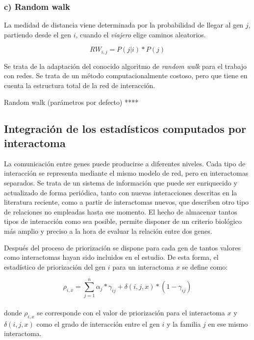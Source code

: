 \subsubsection{c) Random walk}

La medidad de distancia viene determinada por la probabilidad de llegar al gen $j$, partiendo desde el gen $i$, cuando el \emph{viajero} elige caminos aleatorios.

\begin{equation}
RW_{i,j} = P(j|i)*P(j)
\end{equation}

Se trata de la adaptación del conocido algoritmo de \emph{random walk} para el trabajo con redes. Se trata de un método computacionalmente costoso, pero que tiene en cuenta la estructura total de la red de interacción.

Random walk (parámetros por defecto) ****


\subsection{Integración de los estadísticos computados por interactoma}

La comunicación entre genes puede producirse a diferentes niveles. Cada tipo de interacción se representa mediante el mismo modelo de red, pero en interactomas separados. Se trata de un sistema de información que puede ser enriquecido y actualizado de forma periódica, tanto con nuevas interacciones descritas en la literatura reciente, como a partir de interactomas nuevos, que describen otro tipo de relaciones no empleadas hasta ese momento. El hecho de almacenar tantos tipos de interacción como sea posible, permite disponer de un criterio biológico más amplio y preciso a la hora de evaluar la relación entre dos genes.
	
	\medskip
Después del proceso de priorización se dispone para cada gen de tantos valores como interactomas hayan sido incluidos en el estudio. De esta forma, el estadístico de priorización del gen $i$ para un interactoma $x$ se define como:


\begin{equation}
\rho_{i,x} = \sum_{j=1}^{n} \alpha_j * \gamma_{ij} + \delta(i,j,x)*(1-\gamma_{ij})
\end{equation}
\\

donde $\rho_{i,x}$ se corresponde con el valor de priorización para el interactoma $x$ y $\delta(i,j,x)$ como el grado de interacción entre el gen $i$ y la familia $j$ en ese mismo interactoma.
\\

